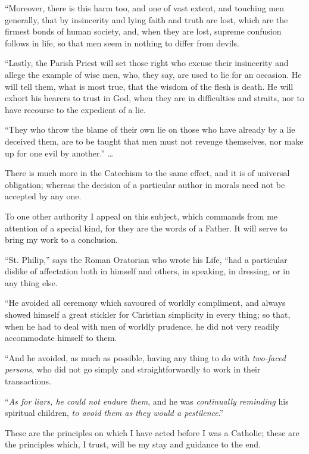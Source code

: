 ``Moreover, there is this harm too, and one of vast extent, and
touching men generally, that by insincerity and lying faith and truth
are lost, which are the firmest bonds of human society, and, when they
are lost, supreme confusion follows in life, so that men seem in nothing
to differ from devils.

``Lastly, the Parish Priest will set those right who excuse their
insincerity and allege the example of wise men, who, they say, are
used to lie for an occasion. He will tell them, what is most true, that
the wisdom of the flesh is death. He will exhort his hearers to trust in
God, when they are in difficulties and straits, nor to have recourse to
the expedient of a lie.

``They who throw the blame of their own lie on those who have
already by a lie deceived them, are to be taught that men must not
revenge themselves, nor make up for one evil by another.'' …

There is much more in the Catechism to the same effect, and it is of
universal obligation; whereas the decision of a particular author in
morals need not be accepted by any one.

To one other authority I appeal on this subject, which commands from
me attention of a special kind, for they are the words of a Father. It will serve to bring my work to a conclusion.

``St. Philip,'' says the Roman Oratorian who wrote his Life,
``had a particular dislike of affectation both in himself and
others, in speaking, in dressing, or in any thing else.

``He avoided all ceremony which savoured of worldly compliment,
and always showed himself a great stickler for Christian simplicity in
every thing; so that, when he had to deal with men of worldly prudence,
he did not very readily accommodate himself to them.

``And he avoided, as much as possible, having any thing to do
with \emph{two-faced persons}, who did not go simply and
straightforwardly to work in their transactions.

``\emph{As for liars, he could not endure them}, and he was \emph{continually
reminding} his spiritual children, \emph{to avoid them as they would a
pestilence}.''

These are the principles on which I have acted before I was a
Catholic; these are the principles which, I trust, will be my stay and
guidance to the end.

